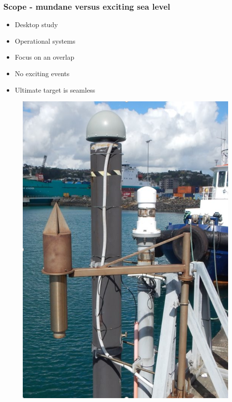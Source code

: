 \begin{frame}
\frametitle{Scope - mundane versus exciting sea level}
\begin{minipage}{0.45\textwidth}
    \begin{itemize}
        \item Desktop study
        \item Operational systems
        \item Focus on an overlap
        \item No exciting events
        \item Ultimate target is seamless
    \end{itemize}
\end{minipage}
\hfill
\begin{minipage}{0.45\textwidth}
    \begin{figure}      
    \includegraphics[width=\textwidth]{figures/images/tidegaugeEg.png}
    \end{figure}
\end{minipage}
\end{frame}

